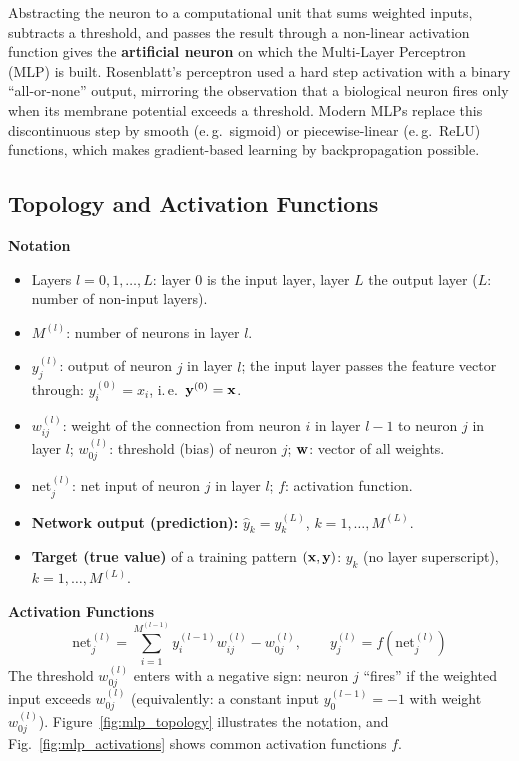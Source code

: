 Abstracting the neuron to a computational unit that sums weighted inputs, subtracts a threshold, and passes the result through a non-linear activation function gives the \textbf{artificial neuron} on which the Multi-Layer Perceptron (MLP) is built. Rosenblatt's perceptron used a hard step activation with a binary ``all-or-none'' output, mirroring the observation that a biological neuron fires only when its membrane potential exceeds a threshold. Modern MLPs replace this discontinuous step by smooth (e.\,g.\ sigmoid) or piecewise-linear (e.\,g.\ ReLU) functions, which makes gradient-based learning by backpropagation possible.

\subsection{Topology and Activation Functions}

\textbf{Notation}
{\small
\begin{itemize}
  \item Layers $l=0,1,\dots,L$: layer $0$ is the input layer, layer $L$ the output layer ($L$: number of non-input layers).
  \item $M^{(l)}$: number of neurons in layer $l$.
  \item $y_j^{(l)}$: output of neuron $j$ in layer $l$; the input layer passes the feature vector through: $y_i^{(0)} = x_i$, i.\,e.\ $\bm{\mathrm{y}}^{(0)}=\bm{\mathrm{x}}$.
  \item $w_{ij}^{(l)}$: weight of the connection from neuron $i$ in layer $l-1$ to neuron $j$ in layer $l$; $w_{0j}^{(l)}$: threshold (bias) of neuron $j$; $\bm{\mathrm{w}}$: vector of all weights.
  \item $\text{net}_j^{(l)}$: net input of neuron $j$ in layer $l$; $f$: activation function.
  \item \textbf{Network output (prediction):} $\hat y_k = y_k^{(L)}$, $k=1,\dots,M^{(L)}$.
  \item \textbf{Target (true value)} of a training pattern $(\bm{\mathrm{x}}, \bm{\mathrm{y}})$: $y_k$ (no layer superscript), $k=1,\dots,M^{(L)}$.
\end{itemize}
}

\textbf{Activation Functions}
\begin{displaymath}
  \text{net}_j^{(l)} = \sum_{i=1}^{M^{(l-1)}} y_i^{(l-1)} w_{ij}^{(l)} - w_{0j}^{(l)},
  \qquad
  y_j^{(l)} = f(\text{net}_j^{(l)})
\end{displaymath}
{\small The threshold $w_{0j}^{(l)}$ enters with a negative sign: neuron $j$ ``fires'' if the weighted input exceeds $w_{0j}^{(l)}$ (equivalently: a constant input $y_0^{(l-1)}=-1$ with weight $w_{0j}^{(l)}$).}
Figure~\ref{fig:mlp_topology} illustrates the notation, and Fig.~\ref{fig:mlp_activations} shows common activation functions $f$.


